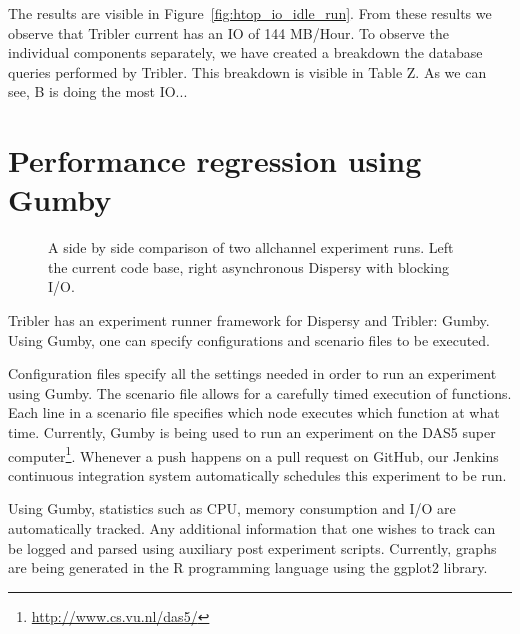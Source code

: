 The results are visible in Figure~\ref{fig:htop_io_idle_run}. 
From these results we observe that Tribler current has an IO of 144 MB/Hour.
To observe the individual components separately, we have created a breakdown the database queries performed by Tribler.
This breakdown is visible in Table Z.
As we can see, B is doing the most IO... 

\section{Performance regression using Gumby}

\begin{figure}[h]
	\caption{A side by side comparison of two allchannel experiment runs. Left the current code base, right asynchronous Dispersy with blocking I/O.}
	\label{fig:side_by_side_send}
\end{figure} 

Tribler has an experiment runner framework for Dispersy and Tribler: Gumby.
Using Gumby, one can specify configurations and scenario files to be executed.

Configuration files specify all the settings needed in order to run an experiment using Gumby.
The scenario file allows for a carefully timed execution of functions.
Each line in a scenario file specifies which node executes which function at what time. 
Currently, Gumby is being used to run an experiment on the DAS5 super computer\footnote{\url{http://www.cs.vu.nl/das5/}}.
Whenever a push happens on a pull request on GitHub, our Jenkins continuous integration system automatically schedules this experiment to be run.

Using Gumby, statistics such as CPU, memory consumption and I/O are automatically tracked.
Any additional information that one wishes to track can be logged and parsed using auxiliary post experiment scripts.
Currently, graphs are being generated in the R programming language using the ggplot2 library.

